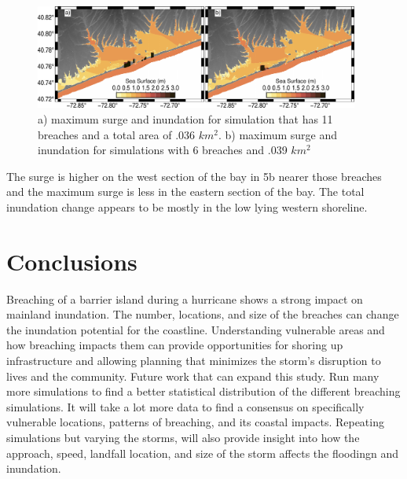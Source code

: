 \documentclass{coastal_paper}
\begin{document}
\begin{figure}
    \centering
    \includegraphics[width=0.95\textwidth]{figures/fig5.pdf}
    \caption{a) maximum surge and inundation for simulation that has 11 breaches and a total area of .036 $km^2$. b) maximum surge and inundation for simulations with 6 breaches and .039 $km^2$}
    \label{fig5}
\end{figure}

The surge is higher on the west section of the bay in 5b nearer those breaches and the maximum surge is less in the eastern section of the bay. The total inundation change appears to be mostly in the low lying western shoreline.


\section{Conclusions}
Breaching of a barrier island during a hurricane shows a strong impact on mainland inundation. The number, locations, and size of the breaches can change the inundation potential for the coastline. Understanding vulnerable areas and how breaching impacts them can provide opportunities for shoring up infrastructure and allowing planning that minimizes the storm's disruption to lives and the community.
Future work that can expand this study. Run many more simulations to find a better statistical distribution of the different breaching simulations. It will take a lot more data to find a consensus on specifically vulnerable locations, patterns of breaching, and its coastal impacts. Repeating simulations but varying the storms, will also provide insight into how the approach, speed, landfall location, and size of the storm affects the floodingn and inundation.



\end{document}
